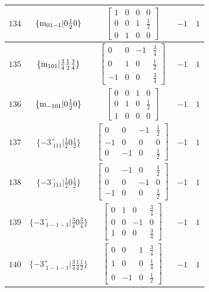\documentclass[fleqn,8pt]{jsarticle}
\begin{document}
\begin{longtable}{ccccc}
$ 134 $ & $ \{{\rm m}_{01-1}|0 \frac{1}{2} 0\} $ & $ \begin{bmatrix} 1 & 0 & 0 & 0 \\ 0 & 0 & 1 & \frac{1}{2} \\ 0 & 1 & 0 & 0 \end{bmatrix} $ & $ -1 $ & $ 1 $ \\ \hline
$ 135 $ & $ \{{\rm m}_{101}|\frac{3}{4} \frac{1}{2} \frac{3}{4}\} $ & $ \begin{bmatrix} 0 & 0 & -1 & \frac{3}{4} \\ 0 & 1 & 0 & \frac{1}{2} \\ -1 & 0 & 0 & \frac{3}{4} \end{bmatrix} $ & $ -1 $ & $ 1 $ \\ \hline
$ 136 $ & $ \{{\rm m}_{-101}|0 \frac{1}{2} 0\} $ & $ \begin{bmatrix} 0 & 0 & 1 & 0 \\ 0 & 1 & 0 & \frac{1}{2} \\ 1 & 0 & 0 & 0 \end{bmatrix} $ & $ -1 $ & $ 1 $ \\ \hline
$ 137 $ & $ \{-3^{+}_{\,\,111}|\frac{1}{2} 0 \frac{1}{2}\} $ & $ \begin{bmatrix} 0 & 0 & -1 & \frac{1}{2} \\ -1 & 0 & 0 & 0 \\ 0 & -1 & 0 & \frac{1}{2} \end{bmatrix} $ & $ -1 $ & $ 1 $ \\ \hline
$ 138 $ & $ \{-3^{-}_{\,\,111}|\frac{1}{2} 0 \frac{1}{2}\} $ & $ \begin{bmatrix} 0 & -1 & 0 & \frac{1}{2} \\ 0 & 0 & -1 & 0 \\ -1 & 0 & 0 & \frac{1}{2} \end{bmatrix} $ & $ -1 $ & $ 1 $ \\ \hline
$ 139 $ & $ \{-3^{-}_{\,\,1-1-1}|\frac{3}{4} 0 \frac{3}{4}\} $ & $ \begin{bmatrix} 0 & 1 & 0 & \frac{3}{4} \\ 0 & 0 & -1 & 0 \\ 1 & 0 & 0 & \frac{3}{4} \end{bmatrix} $ & $ -1 $ & $ 1 $ \\ \hline
$ 140 $ & $ \{-3^{+}_{\,\,1-1-1}|\frac{3}{4} \frac{1}{4} \frac{1}{2}\} $ & $ \begin{bmatrix} 0 & 0 & 1 & \frac{3}{4} \\ 1 & 0 & 0 & \frac{1}{4} \\ 0 & -1 & 0 & \frac{1}{2} \end{bmatrix} $ & $ -1 $ & $ 1 $ \\ \hline

\end{longtable}
\end{document}
